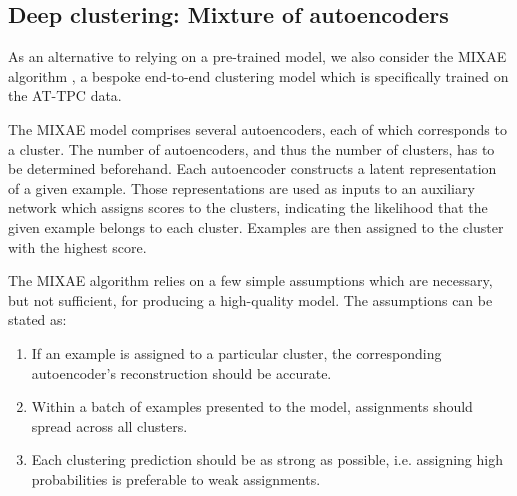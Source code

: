 \documentclass[review,number,sort&compress]{elsarticle}
\newcommand{\R}{\mathbb{R}}
\begin{document}


\subsection{Deep clustering: Mixture of autoencoders}\label{sec:mixae}

As an alternative to relying on a pre-trained model, we also consider the MIXAE algorithm \cite{Zhang}, a bespoke end-to-end clustering model which is specifically trained on the AT-TPC data.

The MIXAE model comprises several autoencoders, each of which corresponds to a cluster. The number of autoencoders, and thus the number of clusters, has to be determined beforehand. Each autoencoder constructs a latent representation of a given example. Those representations are used as inputs to an auxiliary network which assigns scores to the clusters, indicating the likelihood that the given example belongs to each cluster. Examples are then assigned to the cluster with the highest score.  


The MIXAE algorithm relies on a few simple assumptions which are necessary, but not sufficient, for producing a high-quality model. The assumptions can be stated as: 
\begin{enumerate}
	\item  If an example is assigned to a particular cluster, the corresponding autoencoder's reconstruction should be accurate. 
	\item Within a batch of examples presented to the model, assignments should spread across all clusters. 
	\item Each clustering prediction should be as strong as possible, i.e. assigning high probabilities is preferable to weak assignments.
\end{enumerate}
\end{document}
